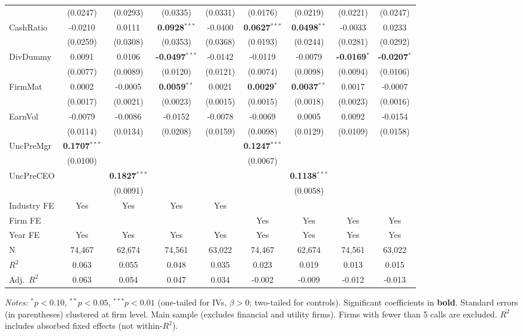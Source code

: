 \documentclass[11pt,a4paper]{article}
\begin{document}
\begin{table}[htbp]
\begin{tabular}{lcccccccc}
 & (0.0247) & (0.0293) & (0.0335) & (0.0331) & (0.0176) & (0.0219) & (0.0221) & (0.0247) \\
CashRatio & -0.0210 & 0.0111 & \textbf{0.0928}$^{***}$ & -0.0400 & \textbf{0.0627}$^{***}$ & \textbf{0.0498}$^{**}$ & -0.0033 & 0.0233 \\
 & (0.0259) & (0.0308) & (0.0353) & (0.0368) & (0.0193) & (0.0244) & (0.0281) & (0.0292) \\
DivDummy & 0.0091 & 0.0106 & \textbf{-0.0497}$^{***}$ & -0.0142 & -0.0119 & -0.0079 & \textbf{-0.0169}$^{*}$ & \textbf{-0.0207}$^{*}$ \\
 & (0.0077) & (0.0089) & (0.0120) & (0.0121) & (0.0074) & (0.0098) & (0.0094) & (0.0106) \\
FirmMat & 0.0002 & -0.0005 & \textbf{0.0059}$^{**}$ & 0.0021 & \textbf{0.0029}$^{*}$ & \textbf{0.0037}$^{**}$ & 0.0017 & -0.0007 \\
 & (0.0017) & (0.0021) & (0.0023) & (0.0015) & (0.0015) & (0.0018) & (0.0023) & (0.0016) \\
EarnVol & -0.0079 & -0.0086 & -0.0152 & -0.0078 & -0.0069 & 0.0005 & 0.0092 & -0.0154 \\
 & (0.0114) & (0.0134) & (0.0208) & (0.0159) & (0.0098) & (0.0129) & (0.0109) & (0.0158) \\
UncPreMgr & \textbf{0.1707}$^{***}$ &  &  &  & \textbf{0.1247}$^{***}$ &  &  &  \\
 & (0.0100) &  &  &  & (0.0067) &  &  &  \\
UncPreCEO &  & \textbf{0.1827}$^{***}$ &  &  &  & \textbf{0.1138}$^{***}$ &  &  \\
 &  & (0.0091) &  &  &  & (0.0058) &  &  \\
\midrule
Industry FE & Yes & Yes & Yes & Yes &  &  &  &  \\
Firm FE &  &  &  &  & Yes & Yes & Yes & Yes \\
Year FE & Yes & Yes & Yes & Yes & Yes & Yes & Yes & Yes \\
\midrule
N & 74,467 & 62,674 & 74,561 & 63,022 & 74,467 & 62,674 & 74,561 & 63,022 \\
$R^2$ & 0.063 & 0.055 & 0.048 & 0.035 & 0.023 & 0.019 & 0.013 & 0.015 \\
Adj.~$R^2$ & 0.063 & 0.054 & 0.047 & 0.034 & -0.002 & -0.009 & -0.012 & -0.013 \\
\bottomrule
\end{tabular}
\begin{minipage}{\linewidth}
\vspace{2pt}\scriptsize
\textit{Notes:} $^{*}p<0.10$, $^{**}p<0.05$, $^{***}p<0.01$ (one-tailed for IVs, $\beta > 0$; two-tailed for controls).
 Significant coefficients in \textbf{bold}.
 Standard errors (in parentheses) clustered at firm level.
 Main sample (excludes financial and utility firms). Firms with fewer than 5 calls are excluded.
 $R^2$ includes absorbed fixed effects (not within-$R^2$).
\end{minipage}
\end{table}
\end{document}
